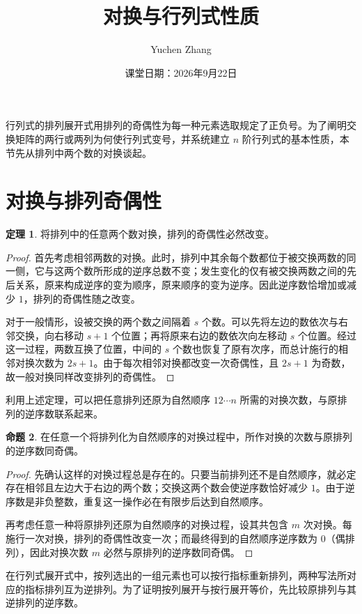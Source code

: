 \documentclass[UTF8, fontset=fandol, a4paper, 12pt]{ctexart}
\title{对换与行列式性质}
\author{Yuchen Zhang}
\date{课堂日期：2026年9月22日}
\makeatletter
\theoremstyle{definition}
\newtheorem{theorem}{定理}[section]
\newtheorem{proposition}[theorem]{命题}
\renewcommand{\maketitle}{%
  \begin{center}
    {\LARGE\bfseries \@title\par}\vspace{0.6em}
    \@author\par\vspace{0.2em}
    {\small \@date\par}
  \end{center}
}
\makeatother
\begin{document}
\maketitle

行列式的排列展开式用排列的奇偶性为每一种元素选取规定了正负号。为了阐明交换矩阵的两行或两列为何使行列式变号，并系统建立 $n$ 阶行列式的基本性质，本节先从排列中两个数的对换谈起。

\section{对换与排列奇偶性}

\begin{theorem}
将排列中的任意两个数对换，排列的奇偶性必然改变。
\end{theorem}
\begin{proof}
首先考虑相邻两数的对换。此时，排列中其余每个数都位于被交换两数的同一侧，它与这两个数所形成的逆序总数不变；发生变化的仅有被交换两数之间的先后关系，原来构成逆序的变为顺序，原来顺序的变为逆序。因此逆序数恰增加或减少 $1$，排列的奇偶性随之改变。

对于一般情形，设被交换的两个数之间隔着 $s$ 个数。可以先将左边的数依次与右邻交换，向右移动 $s+1$ 个位置；再将原来右边的数依次向左移动 $s$ 个位置。经过这一过程，两数互换了位置，中间的 $s$ 个数也恢复了原有次序，而总计施行的相邻对换次数为 $2s+1$。由于每次相邻对换都改变一次奇偶性，且 $2s+1$ 为奇数，故一般对换同样改变排列的奇偶性。
\end{proof}

利用上述定理，可以把任意排列还原为自然顺序 $12\cdots n$ 所需的对换次数，与原排列的逆序数联系起来。

\begin{proposition}
在任意一个将排列化为自然顺序的对换过程中，所作对换的次数与原排列的逆序数同奇偶。
\end{proposition}
\begin{proof}
先确认这样的对换过程总是存在的。只要当前排列还不是自然顺序，就必定存在相邻且左边大于右边的两个数；交换这两个数会使逆序数恰好减少 $1$。由于逆序数是非负整数，重复这一操作必在有限步后达到自然顺序。

再考虑任意一种将原排列还原为自然顺序的对换过程，设其共包含 $m$ 次对换。每施行一次对换，排列的奇偶性改变一次；而最终得到的自然顺序逆序数为 $0$（偶排列），因此对换次数 $m$ 必然与原排列的逆序数同奇偶。
\end{proof}

在行列式展开式中，按列选出的一组元素也可以按行指标重新排列，两种写法所对应的指标排列互为逆排列。为了证明按列展开与按行展开等价，先比较原排列与其逆排列的逆序数。
\end{document}
